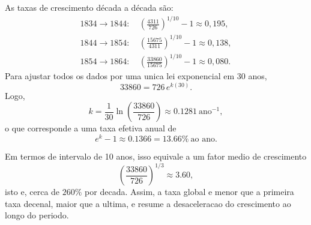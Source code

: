 As taxas de crescimento década a década são:
\begin{align*}
1834\to1844: &\ \left(\frac{4311}{726}\right)^{1/10}-1\approx0{,}195,\\
1844\to1854: &\ \left(\frac{15675}{4311}\right)^{1/10}-1\approx0{,}138,\\
1854\to1864: &\ \left(\frac{33860}{15675}\right)^{1/10}-1\approx0{,}080.
\end{align*}
Para ajustar todos os dados por uma unica lei exponencial em 30 anos,
\[
33860=726\,e^{k(30)}.
\]
Logo,
\[
k=\frac{1}{30}\ln\left(\frac{33860}{726}\right)\approx0.1281\ \text{ano}^{-1},
\]
o que corresponde a uma taxa efetiva anual de
\[
e^k-1\approx 0.1366=13.66\%\ \text{ao ano}.
\]

Em termos de intervalo de 10 anos, isso equivale a um fator medio de crescimento
\[
\left(\frac{33860}{726}\right)^{1/3}\approx3.60,
\]
isto e, cerca de $260\%$ por decada. Assim, a taxa global e menor que a primeira taxa decenal, maior que a ultima, e resume a desaceleracao do crescimento ao longo do periodo.